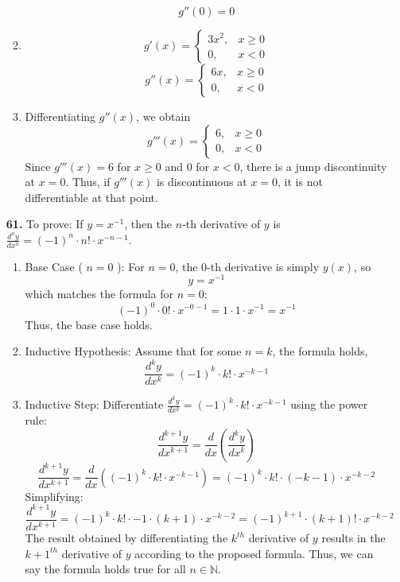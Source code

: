 \documentclass[12pt]{article}
\begin{document}
\begin{enumerate}[start=1,label={\bfseries. },leftmargin=1in]
\begin{enumerate}
        \[
        g''(0) = 0
        \]

        \item 

        \[
        g'(x) = \begin{cases}
            3x^2, & x\geq 0\\
            0, & x<0
        \end{cases}
        \]
        \[
        g''(x) = \begin{cases}
            6x, & x\geq 0\\
            0, & x<0
        \end{cases}
        \]

        \item
        Differentiating $g''(x)$, we obtain
        \[
        g'''(x) = \begin{cases}
            6, & x\geq0\\
            0, & x<0
        \end{cases}
        \]
        Since $g'''(x) = 6$ for $x\geq0$ and $0$ for $x<0$, there is a jump discontinuity at $x=0$. Thus, if $g'''(x)$ is discontinuous at $x=0$, it is not differentiable at that point. 
    \end{enumerate}

    \item [\textbf{61. }]To prove: If \( y = x^{-1} \), then the \( n \)-th derivative of \( y \) is \( \frac{d^ny}{dx^n} = (-1)^n \cdot n! \cdot x^{-n-1} \).
    \begin{enumerate}

    \item Base Case ( \( n = 0 \) ): For \( n = 0 \), the \( 0 \)-th derivative is simply \( y(x) \), so
    \[
    y = x^{-1}
    \]
    which matches the formula for \( n = 0 \):
    \[
    (-1)^0 \cdot 0! \cdot x^{-0-1} = 1 \cdot 1 \cdot x^{-1} = x^{-1}
    \]
    Thus, the base case holds.

    \item Inductive Hypothesis: Assume that for some \( n = k \), the formula holds,
    \[
    \frac{d^ky}{dx^k} = (-1)^k \cdot k! \cdot x^{-k-1}
    \]

    \item Inductive Step: Differentiate \( \frac{d^ky}{dx^k} = (-1)^k \cdot k! \cdot x^{-k-1} \) using the power rule:
    \[
    \frac{d^{k+1}y}{dx^{k+1}} = \frac{d}{dx}\left(\frac{d^{k}y}{dx^{k}}\right)
    \]
    \[
    \frac{d^{k+1}y}{dx^{k+1}}= \frac{d}{dx} \left( (-1)^k \cdot k! \cdot x^{-k-1} \right) = (-1)^k \cdot k! \cdot (-k-1) \cdot x^{-k-2}
    \]
    Simplifying:
    \[
    \frac{d^{k+1}y}{dx^{k+1}}= (-1)^k \cdot k! \cdot -1\cdot(k+1) \cdot x^{-k-2} = (-1)^{k+1} \cdot (k+1)! \cdot x^{-k-2}
    \]
    The result obtained by differentiating the $k^{th}$ derivative of $y$ results in the $k+1^{th}$ derivative of $y$ according to the proposed formula. Thus, we can say the formula holds true for all $n\in \mathbb{N}$.
    \end{enumerate}


\end{enumerate}
\end{document}
